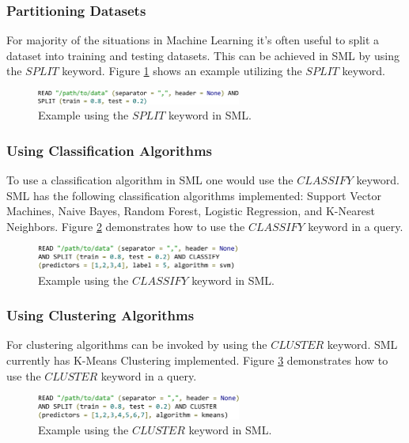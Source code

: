 \documentclass[jair,twoside,11pt,theapa]{article}
\begin{document}
\subsubsection{Partitioning Datasets}
For majority of the situations in Machine Learning it's often useful to split a dataset into training and testing datasets. This can be achieved in SML by using the \(SPLIT\) keyword. Figure \ref{fig:SML:SPLIT} shows an example utilizing the \(SPLIT\) keyword.

\begin{figure}
\includegraphics[width=0.6\textwidth]{figs/SPLIT.png}
\centering
\caption{Example using the \(SPLIT\) keyword in SML.}
\label{fig:SML:SPLIT}
\end{figure}

\subsubsection{Using Classification Algorithms}
To use a classification algorithm in SML one would use the \(CLASSIFY\) keyword. SML has the following classification algorithms implemented: Support Vector Machines, Naive Bayes, Random Forest, Logistic Regression, and K-Nearest Neighbors. Figure \ref{fig:SML:CLASSIFY} demonstrates how to use the \(CLASSIFY\) keyword in a query.

\begin{figure}
\includegraphics[width=0.6\textwidth]{figs/CLASSIFY.png}
\centering
\caption{Example using the \(CLASSIFY\) keyword in SML.}
\label{fig:SML:CLASSIFY}
\end{figure}

\subsubsection{Using Clustering Algorithms}
For clustering algorithms can be invoked by using the \(CLUSTER\) keyword. SML currently has K-Means Clustering implemented. Figure \ref{fig:SML:CLUSTER} demonstrates how to use the \(CLUSTER\) keyword in a query.

\begin{figure}
\includegraphics[width=0.6\textwidth]{figs/CLUSTER.png}
\centering
\caption{Example using the \(CLUSTER\) keyword in SML.}
\label{fig:SML:CLUSTER}
\end{figure}
\end{document}
